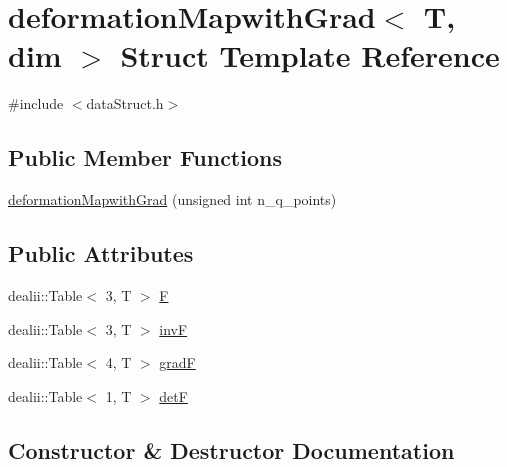 \section{deformation\+Mapwith\+Grad$<$ T, dim $>$ Struct Template Reference}
\label{structdeformation_mapwith_grad}


{\ttfamily \#include $<$data\+Struct.\+h$>$}

\subsection*{Public Member Functions}
\begin{DoxyCompactItemize}
\item 
\mbox{\hyperlink{structdeformation_mapwith_grad_a2c6e68ea962afdc7927d312d097d0bd8}{deformation\+Mapwith\+Grad}} (unsigned int n\+\_\+q\+\_\+points)
\end{DoxyCompactItemize}
\subsection*{Public Attributes}
\begin{DoxyCompactItemize}
\item 
dealii\+::\+Table$<$ 3, T $>$ \mbox{\hyperlink{structdeformation_mapwith_grad_a7934bed7ba72b5e4a3af1fd8a4e14198}{F}}
\item 
dealii\+::\+Table$<$ 3, T $>$ \mbox{\hyperlink{structdeformation_mapwith_grad_ae40deb9e4616ec6d0b77519e56646ce0}{invF}}
\item 
dealii\+::\+Table$<$ 4, T $>$ \mbox{\hyperlink{structdeformation_mapwith_grad_a5bd7f05522c7d581d02e4de55682f5f2}{gradF}}
\item 
dealii\+::\+Table$<$ 1, T $>$ \mbox{\hyperlink{structdeformation_mapwith_grad_aa1ff2dc8fb6f4f6e9125ca026505a977}{detF}}
\end{DoxyCompactItemize}


\subsection{Constructor \& Destructor Documentation}
\mbox{\label{structdeformation_mapwith_grad_a2c6e68ea962afdc7927d312d097d0bd8}} 
